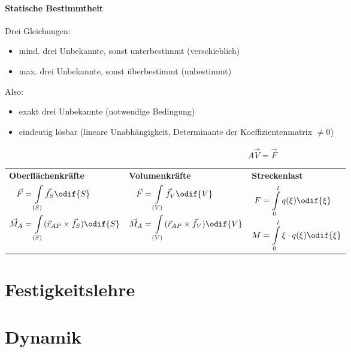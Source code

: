\paragraph{Statische Bestimmtheit}
Drei Gleichungen:
\begin{itemize}
	\item[$\to$] mind. drei Unbekannte, sonst unterbestimmt (verschieblich)
	\item[$\to$] max. drei Unbekannte, sonst überbestimmt (unbestimmt)
\end{itemize}
Also:
\begin{itemize}
	\item exakt drei Unbekannte (notwendige Bedingung)
	\item eindeutig lösbar (lineare Unabhängigkeit, Determinante der Koeffizientenmatrix $\neq 0$)
\end{itemize}
\begin{align*}
	A\vec{V}=\vec{F}
\end{align*}
\begin{center}
	\begin{tabularx}{0.9\textwidth}{XXX}
	{\bfseries Oberflächenkräfte}&{\bfseries Volumenkräfte}&{\bfseries Streckenlast}\\
	$\begin{aligned}
	\vec{F}&=\int\limits_{(S)}\vec{f}_S\odif{S}\\
	\vec{M}_A&=\int\limits_{(S)}(\vec{r}_{AP}\times\vec{f}_S)\odif{S}
\end{aligned}$&$\begin{aligned}
	\vec{F}&=\int\limits_{(V)}\vec{f}_V\odif{V}\\
	\vec{M}_A&=\int\limits_{(V)}(\vec{r}_{AP}\times\vec{f}_V)\odif{V}
\end{aligned}$&
$\begin{aligned}
	F &= \int\limits_0^l q(\xi)\odif{\xi}\\
	M &= \int\limits_0^l \xi\cdot q(\xi)\odif{\xi}
\end{aligned}$
\end{tabularx}
\end{center}


\section{Festigkeitslehre}

\section{Dynamik}

